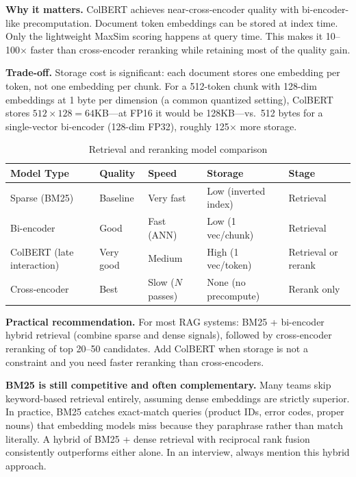 \textbf{Why it matters.} ColBERT achieves near-cross-encoder quality with bi-encoder-like precomputation. Document token embeddings can be stored at index time. Only the lightweight MaxSim scoring happens at query time. This makes it 10--100$\times$ faster than cross-encoder reranking while retaining most of the quality gain.

\textbf{Trade-off.} Storage cost is significant: each document stores one embedding per token, not one embedding per chunk. For a 512-token chunk with 128-dim embeddings at 1 byte per dimension (a common quantized setting), ColBERT stores $512 \times 128 = 64$KB---at FP16 it would be 128KB---vs.\ 512 bytes for a single-vector bi-encoder (128-dim FP32), roughly 125$\times$ more storage.

\begin{table}[H]
\centering
\caption{Retrieval and reranking model comparison}
\begin{tabularx}{\textwidth}{lXXXl}
\toprule
\textbf{Model Type} & \textbf{Quality} & \textbf{Speed} & \textbf{Storage} & \textbf{Stage} \\
\midrule
Sparse (BM25) & Baseline & Very fast & Low (inverted index) & Retrieval \\
Bi-encoder & Good & Fast (ANN) & Low (1 vec/chunk) & Retrieval \\
ColBERT (late interaction) & Very good & Medium & High (1 vec/token) & Retrieval or rerank \\
Cross-encoder & Best & Slow ($N$ passes) & None (no precompute) & Rerank only \\
\bottomrule
\end{tabularx}
\end{table}

\textbf{Practical recommendation.} For most RAG systems: BM25 + bi-encoder hybrid retrieval (combine sparse and dense signals), followed by cross-encoder reranking of top 20--50 candidates. Add ColBERT when storage is not a constraint and you need faster reranking than cross-encoders.

\begin{warningbox}
\textbf{BM25 is still competitive and often complementary.} Many teams skip keyword-based retrieval entirely, assuming dense embeddings are strictly superior. In practice, BM25 catches exact-match queries (product IDs, error codes, proper nouns) that embedding models miss because they paraphrase rather than match literally. A hybrid of BM25 + dense retrieval with reciprocal rank fusion consistently outperforms either alone. In an interview, always mention this hybrid approach.
\end{warningbox}

